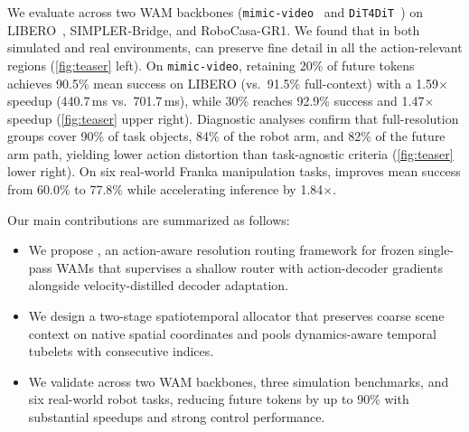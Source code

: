     We evaluate \method across two WAM backbones (\texttt{mimic-video}~\cite{pai2025mimicvideo} and \texttt{DiT4DiT}~\cite{ma2026dit4dit}) on LIBERO~\cite{liu2023libero}, SIMPLER-Bridge, and RoboCasa-GR1. We found that in both simulated and real environments, \method can preserve fine detail in all the action-relevant regions (\cref{fig:teaser} left).
    On \texttt{mimic-video}, retaining 20\% of future tokens achieves 90.5\% mean success on LIBERO (vs.\ 91.5\% full-context) with a 1.59$\times$ speedup (440.7\,ms vs.\ 701.7\,ms), while 30\% reaches 92.9\% success and 1.47$\times$ speedup (\cref{fig:teaser} upper right).
    Diagnostic analyses confirm that full-resolution groups cover 90\% of task objects, 84\% of the robot arm, and 82\% of the future arm path, yielding lower action distortion than task-agnostic criteria (\cref{fig:teaser} lower right).
    On six real-world Franka manipulation tasks, \method improves mean success from 60.0\% to 77.8\% while accelerating inference by 1.84$\times$.
    
    Our main contributions are summarized as follows:
    \begin{itemize}
        \item We propose \method, an action-aware resolution routing framework for frozen single-pass WAMs that supervises a shallow router with action-decoder gradients alongside velocity-distilled decoder adaptation.
        \item We design a two-stage spatiotemporal allocator that preserves coarse scene context on native spatial coordinates and pools dynamics-aware temporal tubelets with consecutive indices.
        \item We validate \method across two WAM backbones, three simulation benchmarks, and six real-world robot tasks, reducing future tokens by up to 90\% with substantial speedups and strong control performance.
    \end{itemize}


